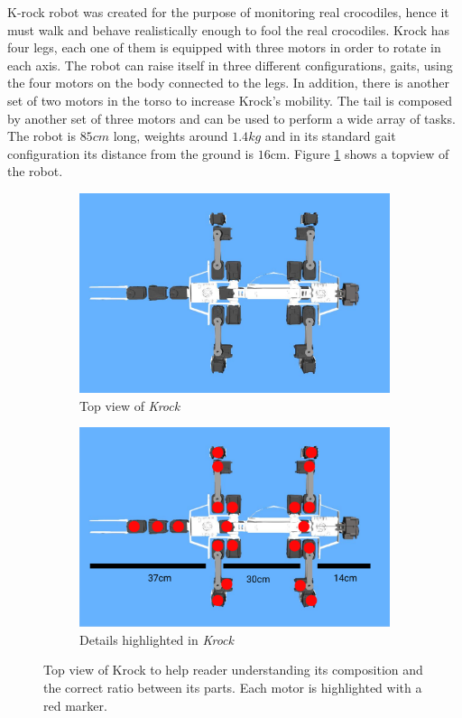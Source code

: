 \documentclass[../document.tex]{subfiles}
\begin{document}
    K-rock robot was created for the purpose of monitoring real crocodiles, hence it must walk and behave realistically enough to fool the real crocodiles. Krock has four legs, each one of them is equipped with three motors in order to rotate in each axis. The robot can raise itself in three different configurations, gaits, using the four motors on the body connected to the legs. In addition, there is another set of two motors in the torso to increase Krock's mobility. 
The tail is composed by another set of three motors and can be used to perform a wide array of tasks.
The robot is $85cm$ long, weights around $1.4kg$ and in its standard gait configuration its distance from the ground is $16$cm. Figure \ref{fig : krock-top} shows a topview of the robot.
\begin{figure}[htbp]
\centering
     \begin{subfigure}[b]{0.49\textwidth}
    \includegraphics[width=\textwidth]{../img/krock-top.jpg}
    \caption{Top view of \emph{Krock}}
       \end{subfigure}
     \begin{subfigure}[b]{0.49\textwidth}
      \includegraphics[width=\textwidth]{../img/krock-top-highlight.png}
    \caption{Details highlighted in \emph{Krock}}
       \end{subfigure}
       \caption{Top view of Krock to help reader understanding its composition and the correct ratio between its parts.  Each motor is highlighted with a red marker.}
       \label{fig : krock-top}

\end{figure}
\end{document}
